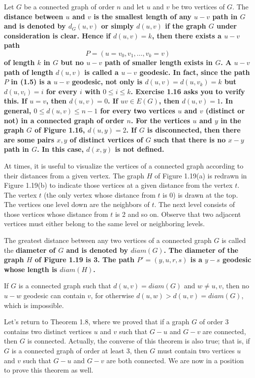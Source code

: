 Let $G$ be a connected graph of order $n$ and let $u$ and $v$ be two vertices of $G$. The \bf{distance} between $u$ and $v$ is the smallest length of any $u-v$ path in $G$ and is denoted by $d_{G}(u,v)$ or simply $d(u,v)$ if the graph $G$ under consideration is clear. Hence if $d(u,v)=k$, then there exists a $u-v$ path
\begin{equation}
P = (u = v_{0},v_{1},\ldots,v_{k} = v)
\end{equation}
of length $k$ in $G$ but no $u-v$ path of smaller length exists in $G$. A $u-v$ path of length $d(u,v)$ is called a $u-v$ \bf{geodesic}. In fact, since the path $P$ in (1.5) is a $u-v$ geodesic, not only is $d(u,v)=d(u,v_{k})=k$ but $d(u,v_{i})=i$ for every $i$ with $0 \leq i \leq k$. Exercise 1.16 asks you to verify this. If $u=v$, then $d(u,v)=0$. If $uv \in E(G)$, then $d(u,v)=1$. In general, $0 \leq d(u,v) \leq n-1$ for every two vertices $u$ and $v$ (distinct or not) in a connected graph of order $n$. For the vertices $u$ and $y$ in the graph $G$ of Figure 1.16, $d(u,y)=2$. If $G$ is disconnected, then there are some pairs $x,y$ of distinct vertices of $G$ such that there is no $x-y$ path in $G$. In this case, $d(x,y)$ is not defined.

At times, it is useful to visualize the vertices of a connected graph according to their distances from a given vertex. The graph $H$ of Figure 1.19(a) is redrawn in Figure 1.19(b) to indicate those vertices at a given distance from the vertex $t$. The vertex $t$ (the only vertex whose distance from $t$ is 0) is drawn at the top. The vertices one level down are the neighbors of $t$. The next level consists of those vertices whose distance from $t$ is 2 and so on. Observe that two adjacent vertices must either belong to the same level or neighboring levels.



The greatest distance between any two vertices of a connected graph $G$ is called the \bf{diameter} of $G$ and is denoted by $diam(G)$. The diameter of the graph $H$ of Figure 1.19 is 3. The path $P' = (y,u,r,s)$ is a $y-s$ geodesic whose length is $diam(H)$.

If $G$ is a connected graph such that $d(u,v) = diam(G)$ and $w \neq u,v$, then no $u-w$ geodesic can contain $v$, for otherwise $d(u,w) > d(u,v) = diam(G)$, which is impossible.

Let's return to Theorem 1.8, where we proved that if a graph $G$ of order 3 contains two distinct vertices $u$ and $v$ such that $G-u$ and $G-v$ are connected, then $G$ is connected. Actually, the converse of this theorem is also true; that is, if $G$ is a connected graph of order at least 3, then $G$ must contain two vertices $u$ and $v$ such that $G-u$ and $G-v$ are both connected. We are now in a position to prove this theorem as well.


